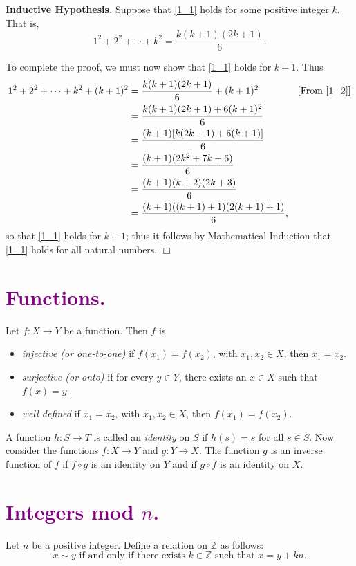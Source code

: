 \documentclass{article}
\newcommand{\qed}{\hfill \ensuremath{\Box}}
\newcommand{\Z}{\mathbb{Z}}
\newcommand{\D}{\displaystyle}
\begin{document}
   \textbf{Inductive Hypothesis.} Suppose that \eqref{1_1} holds for some
   positive integer $k$. That is,
   \begin{equation}
      1^2 + 2^2 + \cdots + k^2 = \D\frac{k(k+1)(2k+1)}{6}. \label{1_2}
   \end{equation}

   To complete the proof, we must now show that \eqref{1_1} holds for $k + 1$.
   Thus
   \begin{align*}
      1^2 + 2^2 + \cdots + k^2 + (k+1)^2 &= \frac{k(k+1)(2k+1)}{6} + (k+1)^2
         &[\text{From }\eqref{1_2}]\\
         &= \frac{k(k+1)(2k+1) + 6(k+1)^2}{6} \\
         &= \frac{(k+1)[k(2k+1) + 6(k+1)]}{6} \\
         &= \frac{(k+1)(2k^2+7k+6)}{6} \\
         &= \frac{(k+1)(k+2)(2k+3)}{6} \\
         &= \frac{(k+1)((k+1)+1)(2(k+1)+1)}{6},
   \end{align*}
   so that \eqref{1_1} holds for $k + 1$; thus it follows by Mathematical
   Induction that \eqref{1_1} holds for all natural numbers. \qed

   \section*{\textcolor{purple}{Functions.}} Let $f : X \rightarrow Y$ be a 
   function. Then $f$ is
   \begin{itemize}
      \item \textit{injective (or one-to-one)} if $f(x_1) = f(x_2)$, with
            $x_1, x_2 \in X$, then $x_1 = x_2$.
      \item \textit{surjective (or onto)} if for every $y \in Y$, there exists
            an $x \in X$ such that $f(x) = y$.
      \item \textit{well defined} if $x_1 = x_2$, with $x_1, x_2 \in X$, then
            $f(x_1) = f(x_2)$.
   \end{itemize}

   A function $h : S \rightarrow T$ is called an \textit{identity} on $S$ if
   $h(s) = s$ for all $s \in S$. Now consider the functions
   $f : X \rightarrow Y$ and $g : Y \rightarrow X$. The function $g$ is an
   inverse function of $f$ if $f \circ g$ is an identity on $Y$ and if
   $g \circ f$ is an identity on $X$.

   \section*{\textcolor{purple}{Integers mod $n$.}} Let $n$ be a positive
   integer. Define a relation on $\Z$ as follows:
   $$x \sim y \text{ if and only if there exists }
     k \in \Z \text{ such that } x = y + kn.$$
\end{document}
